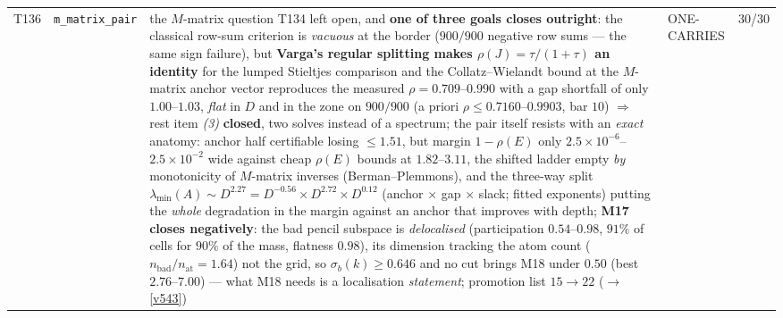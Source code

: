 \documentclass[11pt,a4paper]{article}
\begin{document}
{\begin{xltabular}{\linewidth}{@{}p{0.95cm} >{\raggedright\arraybackslash}p{3.1cm} Y >{\raggedright\scriptsize\arraybackslash}p{3.35cm} p{1.15cm}@{}}
T136 & \texttt{\scriptsize m\_\allowbreak matrix\_\allowbreak pair} & the $M$-matrix question T134 left open, and \textbf{one of three goals closes outright}: the classical row-sum criterion is \emph{vacuous} at the border ($900/900$ negative row sums --- the same sign failure), but \textbf{Varga's regular splitting makes $\rho(J)=\tau/(1+\tau)$ an identity} for the lumped Stieltjes comparison and the Collatz--Wielandt bound at the $M$-matrix anchor vector reproduces the measured $\rho=0.709$--$0.990$ with a gap shortfall of only $1.00$--$1.03$, \emph{flat} in $D$ and in the zone on $900/900$ (a priori $\rho\le0.7160$--$0.9903$, bar $10$) $\Rightarrow$ rest item \emph{(3)} \textbf{closed}, two solves instead of a spectrum; the pair itself resists with an \emph{exact} anatomy: anchor half certifiable losing $\le1.51$, but margin $1-\rho(E)$ only $2.5\times10^{-6}$--$2.5\times10^{-2}$ wide against cheap $\rho(E)$ bounds at $1.82$--$3.11$, the shifted ladder empty \emph{by} monotonicity of $M$-matrix inverses (Berman--Plemmons), and the three-way split $\lambda_{\min}(A)\sim D^{2.27}=D^{-0.56}\times D^{2.72}\times D^{0.12}$ (anchor $\times$ gap $\times$ slack; fitted exponents) putting the \emph{whole} degradation in the margin against an anchor that improves with depth; \textbf{M17 closes negatively}: the bad pencil subspace is \emph{delocalised} (participation $0.54$--$0.98$, $91\%$ of cells for $90\%$ of the mass, flatness $0.98$), its dimension tracking the atom count ($n_{\mathrm{bad}}/n_{\mathrm{at}}=1.64$) not the grid, so $\sigma_b(k)\ge0.646$ and no cut brings M18 under $0.50$ (best $2.76$--$7.00$) --- what M18 needs is a localisation \emph{statement}; promotion list $15\to22$ ($\to$ \vref{v543}) & ONE-CARRIES & 30/30\\

\end{xltabular}}
\end{document}
